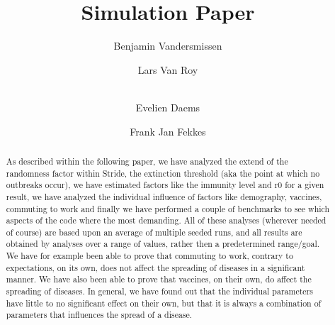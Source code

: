 \documentclass[runningheads]{llncs}
\begin{document}
	\title{Simulation Paper}
	
	\author{Benjamin Vandersmissen \and
		Lars Van Roy \and \\
		Evelien Daems \and
		Frank Jan Fekkes}
	\maketitle              %
	\begin{abstract}
		As described within the following paper, we have analyzed the extend of the randomness factor within Stride, the extinction threshold (aka the point at which no outbreaks occur), we have estimated factors like the immunity level and r0 for a given result, we have analyzed the individual influence of factors like demography, vaccines, commuting to work and finally we have performed a couple of benchmarks to see which aspects of the code where the most demanding. All of these analyses (wherever needed of course) are based upon an average of multiple seeded runs, and all results are obtained by analyses over a range of values, rather then a predetermined range/goal. We have for example been able to prove that commuting to work, contrary to expectations, on its own, does not affect the spreading of diseases in a significant manner. We have also been able to prove that vaccines, on their own, do affect the spreading of diseases. In general, we have found out that the individual parameters have little to no significant effect on their own, but that it is always a combination of parameters that influences the spread of a disease.

		
		
	\end{abstract}
	
	
\end{document}
